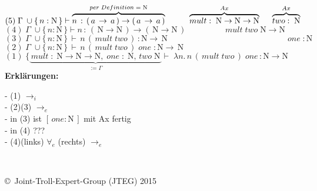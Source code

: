 \documentclass{article}
\begin{document}
	\underline{
		$(5)\;
			\Gamma \;\cup \{\,n:\mathrm{N}\,\} \vdash
			\overbrace{
			n\,:\,(\,a\,\rightarrow\,a\,)\rightarrow (\,a\,\rightarrow \,a\,)
			}^{per\;Definition\; =\;\mathrm{N}}
			\hspace{1cm}
			\overbrace{
			mult:\;\mathrm{N}\rightarrow \mathrm{N}\rightarrow \mathrm{N}
			}^{Ax}
			\hspace{5mm}
			\overbrace{
			two:\;\mathrm{N}
			}^{Ax}
		$
	}\\
	\underline{
		$(4)\;
			\Gamma \;\cup \{\,n:\mathrm{N}\,\} \vdash 
			n\,:\,(\,\mathrm{N}\rightarrow \mathrm{N}\,)
			\rightarrow (\,\mathrm{N}\rightarrow \mathrm{N}\,)
			\hspace{2cm}
			mult\;two\;\mathrm{N}\rightarrow \mathrm{N}
		$
	}\\
	\underline{
	$	(3)\;
		\Gamma \; \cup \{\,n:\mathrm{N}\,\}\,
		\vdash \, n\,(\,mult\;two\,)\,: \mathrm{N}\rightarrow\,\mathrm{N}
		\hspace{6cm}
		\;one\; : \mathrm{N} 
	$
	}\\
	\underline{
	$(2)\;
		\Gamma \; \cup \{\,n:\mathrm{N}\,\}\,
		\vdash \, n\,(\,mult\;two\,)\;one\; : \mathrm{N}\rightarrow\,\mathrm{N}
	$\hspace{48mm}}
	\\
	$	(1)\;
	\{ 
		\underbrace{
			\,mult\;:\;
			\mathrm{N}\rightarrow\mathrm{N}\rightarrow\mathrm{N},\;
			one\; : \; \mathrm{N},\,two\;\mathrm{N}\,
		}_{:=\Gamma}	
	\vdash \; \lambda n.\,n\,(\, mult \; two\,)\;one\,:\mathrm{N}\rightarrow\mathrm{N}
	$		
	\\
	\textbf{Erkl\"arungen:}\\
	\begin{small}
	- (1) $\rightarrow_{i}$\\
	- (2)(3) $\rightarrow_e$\\
	- in (3) ist $[\,one:\mathrm{N}\,]$ mit Ax fertig\\
	- in (4) ???\\
	- (4)(links) $\forall_{e}$ (rechts) $\rightarrow_e$\\
	\end{small}	
		
		
		
		
		
		
		
$ $\\\\
\begin{tiny}
	\copyright\ Joint-Troll-Expert-Group (JTEG) 2015
\end{tiny}
\end{document}
